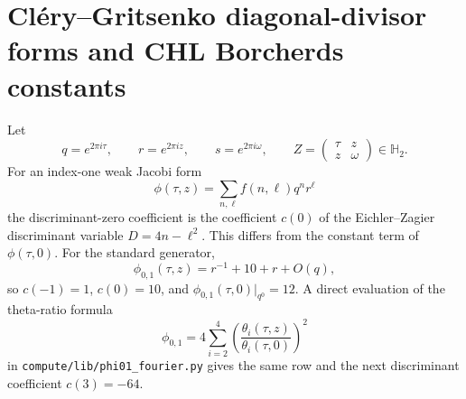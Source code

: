 \providecommand{\Sp}{\mathrm{Sp}}
\providecommand{\Z}{\mathbb{Z}}
\providecommand{\HH}{\mathbb{H}}
\providecommand{\kBKM}{\kappa_{\mathrm{BKM}}}
\providecommand{\wt}{\operatorname{wt}}
\providecommand{\CHL}{\mathrm{CHL}}

\section{Cl\'ery--Gritsenko diagonal-divisor forms and CHL Borcherds constants}
\label{wn:sec:clery-gritsenko-fourier-check}

Let
\[
  q=e^{2\pi i\tau},\qquad r=e^{2\pi iz},\qquad
  s=e^{2\pi i\omega},\qquad
  Z=\begin{pmatrix}\tau&z\\ z&\omega\end{pmatrix}\in\HH_2 .
\]
For an index-one weak Jacobi form
\[
  \phi(\tau,z)=\sum_{n,\ell} f(n,\ell)q^nr^\ell
\]
the discriminant-zero coefficient is the coefficient \(c(0)\) of the
Eichler--Zagier discriminant variable \(D=4n-\ell^2\).  This differs
from the constant term of \(\phi(\tau,0)\).  For the standard generator,
\[
  \phi_{0,1}(\tau,z)=r^{-1}+10+r+O(q),
\]
so \(c(-1)=1\), \(c(0)=10\), and
\(\phi_{0,1}(\tau,0)|_{q^0}=12\).  A direct evaluation of the theta-ratio
formula
\[
  \phi_{0,1}
  =4\sum_{i=2}^{4}\left(\frac{\theta_i(\tau,z)}
  {\theta_i(\tau,0)}\right)^2
\]
in \texttt{compute/lib/phi01\_fourier.py} gives the same row and the next
discriminant coefficient \(c(3)=-64\).

